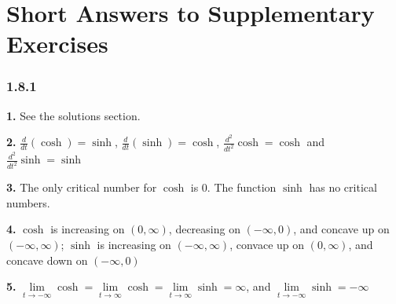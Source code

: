 \documentclass[12pt,]{book}
\theoremstyle{plain}
\theoremstyle{definition}
\numberwithin{equation}{section}
\newcommand{\fe}[2]{\mathop{{#1}{\left(#2\right)}}}
\newcommand{\ointerval}[2]{\left(#1,#2\right)}
\newcommand{\lzoo}[2]{{\frac{d}{d#1}}{\left(#2\right)}}
\newcommand{\lzon}[2]{\frac{d^{#1}}{d#2^{#1}}}
\begin{document}
\chapter[Short Answers to Supplementary Exercises]{Short Answers to Supplementary Exercises}\label{appendix-2}
\begin{multicols}{2}
\subsection*{1.8.1 }
\noindent\textbf{1.}\quad{}
                    See the solutions section.%

                \par\smallskip
\noindent\textbf{2.}\quad{}
                    \(\lzoo{t}{\fe{\cosh}{t}}=\fe{\sinh}{t}\), \(\lzoo{t}{\fe{\sinh}{t}}=\fe{\cosh}{t}\), \(\lzon{2}{t}{\fe{\cosh}{t}}=\fe{\cosh}{t}\) and \(\lzon{2}{t}{\fe{\sinh}{t}}=\fe{\sinh}{t}\)%

                \par\smallskip
\noindent\textbf{3.}\quad{}
                    The only critical number for \(\cosh\) is \(0\). The function \(\sinh\) has no critical numbers.%

                \par\smallskip
\noindent\textbf{4.}\quad{}
                    \(\cosh\) is increasing on \(\ointerval{0}{\infty}\), decreasing on \(\ointerval{-\infty}{0}\), and concave up on \(\ointerval{-\infty}{\infty}\); \(\sinh\) is increasing on \(\ointerval{-\infty}{\infty}\), convace up on \(\ointerval{0}{\infty}\), and concave down on \(\ointerval{-\infty}{0}\)%

                \par\smallskip
\noindent\textbf{5.}\quad{}
                    \(\lim\limits_{t\to-\infty}\fe{\cosh}{t}=\lim\limits_{t\to\infty}\fe{\cosh}{t}=\lim\limits_{t\to\infty}\fe{\sinh}{t}=\infty\), and \(\lim\limits_{t\to-\infty}\fe{\sinh}{t}=-\infty\)%


\end{multicols}
\end{document}
